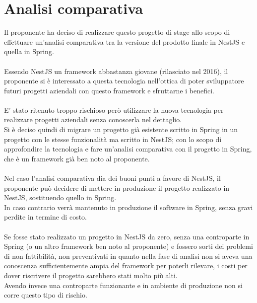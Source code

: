 
\chapter{Analisi comparativa}
\label{cap:analisi-comparativa}


Il proponente ha deciso di realizzare questo progetto di stage allo scopo di effettuare 
un'analisi comparativa tra la versione del prodotto finale in NestJS e quella in Spring.
\\\\
Essendo NestJS un framework abbastanza giovane (rilasciato nel 2016), il proponente si 
è interessato a questa tecnologia nell'ottica di poter sviluppatore futuri progetti 
aziendali con questo framework e sfruttarne i benefici.
\\\\
E' stato ritenuto troppo rischioso però utilizzare la nuova tecnologia per realizzare
progetti aziendali senza conoscerla nel dettaglio. 
\\
Si è deciso quindi di migrare un progetto già 
esistente scritto in Spring in un progetto con le stesse funzionalità ma scritto in NestJS; con 
lo scopo di approfondire la tecnologia e fare un'analisi comparativa
con il progetto in Spring, che è un framework già ben noto al proponente.
\\\\
Nel caso l'analisi comparativa dia dei buoni punti a favore di NestJS, il proponente può 
decidere di mettere in produzione il progetto realizzato in NestJS, sostituendo quello
in Spring.
\\
In caso contrario verrà mantenuto in produzione il software in Spring, senza gravi perdite in termine 
di costo.
\\\\
Se fosse stato realizzato un progetto in NestJS da zero, senza una controparte in Spring (o un altro framework ben noto al proponente)
e fossero sorti dei problemi di non fattibilità, non preventivati in quanto nella fase di analisi 
non si aveva una conoscenza sufficientemente ampia del framework per poterli rilevare, i
costi per dover riscrivere il progetto sarebbero stati molto più alti.
\\
Avendo invece una controparte funzionante e in ambiente di produzione non si corre questo tipo di rischio.


